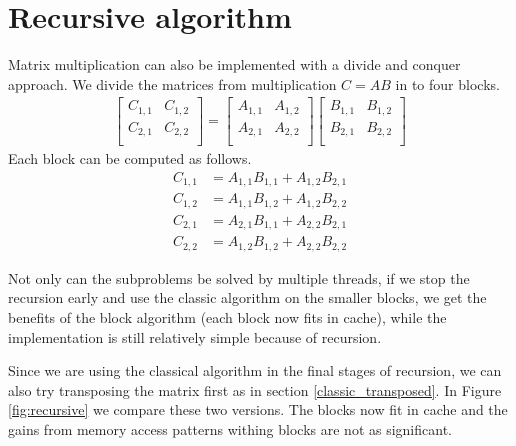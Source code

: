 \documentclass[a4paper,11pt]{article}
\begin{document}

\section{Recursive algorithm}

Matrix multiplication can also be implemented with a divide and conquer approach. We divide the matrices 
from multiplication $C=AB$ in to four blocks.
\begin{align*}
\begin{bmatrix}
C_{1,1} & C_{1,2} \\
C_{2,1} & C_{2,2} \\
\end{bmatrix}
=
\begin{bmatrix}
A_{1,1} & A_{1,2} \\
A_{2,1} & A_{2,2} \\
\end{bmatrix}
\begin{bmatrix}
B_{1,1} & B_{1,2} \\
B_{2,1} & B_{2,2} \\
\end{bmatrix}
\end{align*}
Each block can be computed as follows.
\begin{align*}
C_{1,1} &= A_{1,1}B_{1,1} + A_{1,2}B_{2,1} \\
C_{1,2} &= A_{1,1}B_{1,2} + A_{1,2}B_{2,2} \\
C_{2,1} &= A_{2,1}B_{1,1} + A_{2,2}B_{2,1} \\
C_{2,2} &= A_{1,2}B_{1,2} + A_{2,2}B_{2,2}
\end{align*}

Not only can the subproblems be solved by multiple threads, if we stop the recursion early and use the classic algorithm on the smaller blocks, we get the benefits of the block algorithm (each block now fits in cache), while the implementation is still relatively simple because of recursion.



Since we are using the classical algorithm in the final stages of recursion, we can also try transposing the matrix first as in section \ref{classic_transposed}. In Figure \ref{fig:recursive} we compare these two versions. The blocks now fit in cache and the gains from memory access patterns withing blocks are not as significant. 
\end{document}
